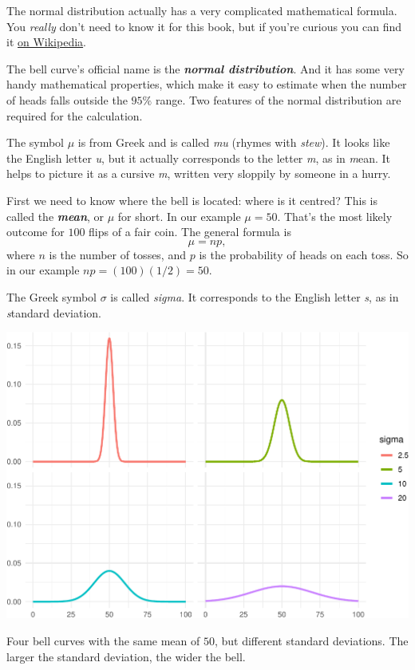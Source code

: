 \documentclass[justified]{tufte-book}
\theoremstyle{definition}
\theoremstyle{definition}
\theoremstyle{definition}
\theoremstyle{remark}
\begin{document}
\begin{marginfigure}
The normal distribution actually has a very complicated mathematical
formula. You \emph{really} don't need to know it for this book, but if
you're curious you can find it
\href{https://en.wikipedia.org/wiki/Normal_distribution}{on Wikipedia}.
\end{marginfigure}

The bell curve's official name is the \textbf{\emph{normal distribution}}. And it has some very handy mathematical properties, which make it easy to estimate when the number of heads falls outside the \(95\%\) range. Two features of the normal distribution are required for the calculation.

\begin{marginfigure}
The symbol \(\mu\) is from Greek and is called \emph{mu} (rhymes with
\emph{stew}). It looks like the English letter \emph{u}, but it actually
corresponds to the letter \emph{m}, as in \emph{m}ean. It helps to
picture it as a cursive \emph{m}, written very sloppily by someone in a
hurry.
\end{marginfigure}

First we need to know where the bell is located: where is it centred? This is called the \textbf{\emph{mean}}, or \(\mu\) for short. In our example \(\mu = 50\). That's the most likely outcome for \(100\) flips of a fair coin. The general formula is
\[ \mu = np, \]
where \(n\) is the number of tosses, and \(p\) is the probability of heads on each toss. So in our example \(np = (100)(1/2) = 50\).

\begin{marginfigure}
The Greek symbol \(\sigma\) is called \emph{sigma}. It corresponds to
the English letter \emph{s}, as in \emph{s}tandard deviation.
\end{marginfigure}

\begin{marginfigure}
\includegraphics{_main_files/figure-latex/normalsds-1} \caption[Four bell curves with the same mean of $50$, but different standard deviations]{Four bell curves with the same mean of $50$, but different standard deviations. The larger the standard deviation, the wider the bell.}\label{fig:normalsds}
\end{marginfigure}
\end{document}
